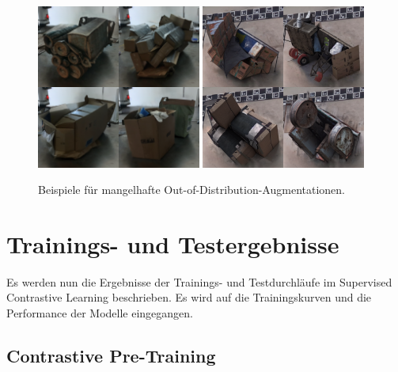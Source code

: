 \begin{figure}
	\centering
	\includegraphics[width=0.48\textwidth]{figure_results_ood-augs_bad_1.png}%
	\hspace{0.02\textwidth}\includegraphics[width=0.48\textwidth]{figure_results_ood-augs_bad_2.png}%
	\caption{Beispiele für mangelhafte Out-of-Distribution-Augmentationen.}
	\label{fig:ood-augs-bad}
\end{figure}

\newpage

\section{Trainings- und Testergebnisse} \label{sec:supcon-results}

Es werden nun die Ergebnisse der Trainings- und Testdurchläufe im Supervised Contrastive Learning beschrieben. Es wird auf die Trainingskurven und die Performance der Modelle eingegangen.

\subsection{Contrastive Pre-Training} \label{subsec:supcon-pre-results}

